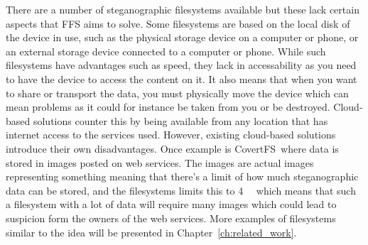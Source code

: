 There are a number of steganographic filesystems available but these lack certain aspects that FFS aims to solve. Some filesystems are based on the local disk of the device in use, such as the physical storage device on a computer or phone, or an external storage device connected to a computer or phone. While such filesystems have advantages such as speed, they lack in accessability as you need to have the device to access the content on it. It also means that when you want to share or transport the data, you must physically move the device which can mean problems as it could for instance be taken from you or be destroyed. Cloud-based solutions counter this by being available from any location that has internet access to the services used. However, existing cloud-based solutions introduce their own disadvantages. Once example is CovertFS\,\cite{baliga2007web} where data is stored in images posted on web services. The images are actual images representing something meaning that there's a limit of how much steganographic data can be stored, and the filesystems limits this to \SI{4}{\kilo\byte} which means that such a filesystem with a lot of data will require many images which could lead to suspicion form the owners of the web services. More examples of filesystems similar to the idea will be presented in Chapter~\ref{ch:related_work}. 